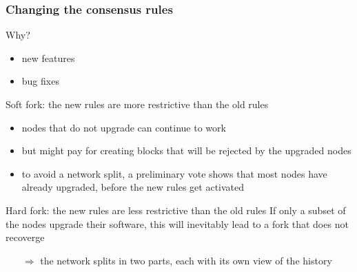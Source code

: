 \documentclass[11pt]{beamer}  %
\begin{document}
\begin{frame}\frametitle{Changing the consensus rules}

  \begin{greenbox}{Why?}
    \begin{itemize}
    \item new features
    \item bug fixes
    \end{itemize}
  \end{greenbox}

  \bigskip

  \begin{greenbox}{Soft fork: the new rules are more restrictive than the old rules}
    \begin{itemize}
    \item nodes that do not upgrade can continue to work
    \item but might pay for creating blocks that will be rejected by the upgraded nodes
    \item to avoid a network split, a preliminary vote shows that
      most nodes have already upgraded, before the new rules get activated
    \end{itemize}
  \end{greenbox}

  \bigskip

  \begin{redbox}{Hard fork: the new rules are less restrictive than the old rules}
    If only a subset of the nodes upgrade their software, this will inevitably
    lead to a fork that does not recoverge
    \begin{itemize}
    \item[$\Rightarrow$] the network splits in two parts, each with its own view of the history
    \end{itemize}
  \end{redbox}

\end{frame}
\end{document}
